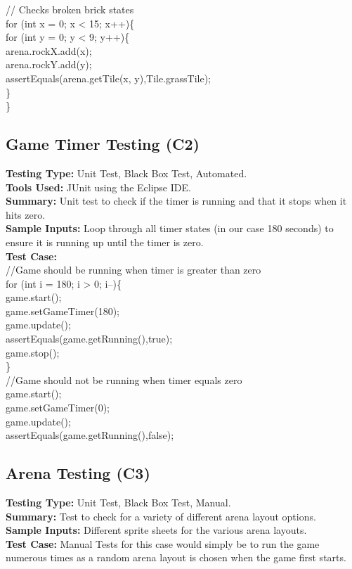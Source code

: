 \documentclass[12pt, letterpaper]{article}
\begin{document}
// Checks broken brick states\\
\indent for (int x = 0; x < 15; x++)\{\\
\indent \indent for (int y = 0; y < 9; y++)\{\\
\indent \indent \indent arena.rockX.add(x);\\
\indent \indent \indent arena.rockY.add(y);\\
\indent \indent \indent assertEquals(arena.getTile(x, y),Tile.grassTile);\\
\indent \indent \}\\
\indent \}\\

\subsection{Game Timer Testing (C2)}
\textbf{Testing Type:} Unit Test, Black Box Test, Automated.\\
\noindent \textbf{Tools Used:} JUnit using the Eclipse IDE.\\
\noindent \textbf{Summary:} Unit test to check if the timer is running and that it stops when it hits zero.\\
\noindent \textbf{Sample Inputs:} Loop through all timer states (in our case 180 seconds) to ensure it is running up until the timer is zero.\\
\noindent \textbf{Test Case:} \\ 

//Game should be running when timer is greater than zero\\
\indent for (int i = 180; i > 0; i--)\{\\
\indent game.start();\\
\indent game.setGameTimer(180);\\
\indent game.update();\\
\indent assertEquals(game.getRunning(),true);\\
\indent game.stop();\\
\indent \}\\

//Game should not be running when timer equals zero\\
\indent game.start();\\
\indent game.setGameTimer(0);\\
\indent game.update();\\
\indent assertEquals(game.getRunning(),false);\\

\subsection{Arena Testing (C3)}
\textbf{Testing Type:} Unit Test, Black Box Test, Manual.\\
\noindent \textbf{Summary:} Test to check for a variety of different arena layout options.\\
\noindent \textbf{Sample Inputs:} Different sprite sheets for the various arena layouts.\\
\noindent \textbf{Test Case:} Manual Tests for this case would simply be to run the game numerous times as a random arena layout is chosen when the game first starts.
\end{document}

